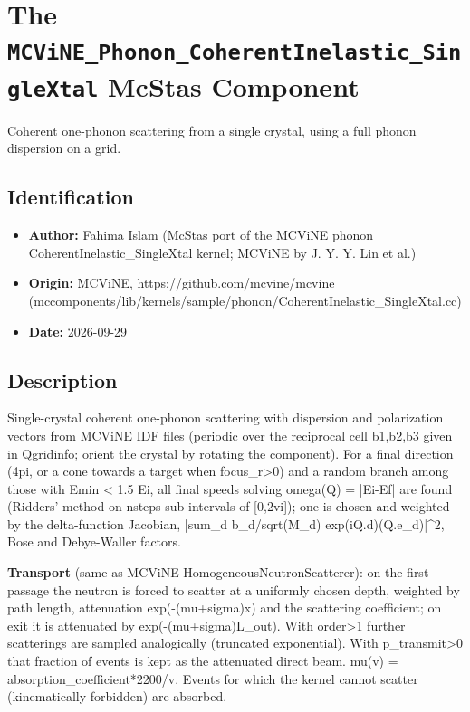 \section{The \texttt{MCViNE\_Phonon\_CoherentInelastic\_SingleXtal} McStas Component}
Coherent one-phonon scattering from a single crystal, using a full phonon dispersion on a grid.

\subsection*{Identification}
\begin{itemize}
  \item \textbf{Author:} Fahima Islam (McStas port of the MCViNE phonon CoherentInelastic\_SingleXtal kernel; MCViNE by J. Y. Y. Lin et al.)
  \item \textbf{Origin:} MCViNE, https://github.com/mcvine/mcvine (mccomponents/lib/kernels/sample/phonon/CoherentInelastic\_SingleXtal.cc)
  \item \textbf{Date:} 2026-09-29
\end{itemize}

\subsection*{Description}
Single-crystal coherent one-phonon scattering with dispersion and polarization vectors from MCViNE IDF files (periodic over the reciprocal cell b1,b2,b3 given in Qgridinfo; orient the crystal by rotating the component). For a final direction (4pi, or a cone towards a target when focus\_r\textgreater{}0) and a random branch among those with Emin \textless{} 1.5 Ei, all final speeds solving omega(Q) = |Ei-Ef| are found (Ridders' method on nsteps sub-intervals of [0,2vi]); one is chosen and weighted by the delta-function Jacobian, |sum\_d b\_d/sqrt(M\_d) exp(iQ.d)(Q.e\_d)|\textasciicircum{}2, Bose and Debye-Waller factors.

\textbf{Transport} (same as MCViNE HomogeneousNeutronScatterer): on the first passage the neutron is forced to scatter at a uniformly chosen depth, weighted by path length, attenuation exp(-(mu+sigma)x) and the scattering coefficient; on exit it is attenuated by exp(-(mu+sigma)L\_out). With order\textgreater{}1 further scatterings are sampled analogically (truncated exponential). With p\_transmit\textgreater{}0 that fraction of events is kept as the attenuated direct beam. mu(v) = absorption\_coefficient*2200/v. Events for which the kernel cannot scatter (kinematically forbidden) are absorbed.


